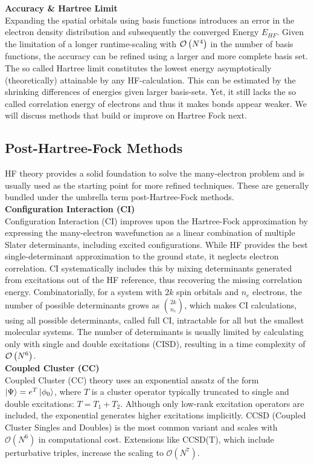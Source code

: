 \textbf{Accuracy \& Hartree Limit}\\
Expanding the spatial orbitals using basis functions introduces an error in the electron density distribution and subsequently the converged Energy $E_{HF}$. Given the limitation of a longer runtime-scaling with $\mathcal{O}\left(N^4\right)$ in the number of basis functions, the accuracy can be refined using a larger and more complete basis set. The so called Hartree limit constitutes the lowest energy asymptotically (theoretically) attainable by any HF-calculation. This can be estimated by the shrinking differences of energies given larger basis-sets. \parencite{ref:Jensen2005hf} Yet, it still lacks the so called correlation energy of electrons and thus it makes bonds appear weaker. We will discuss methods that build or improve on Hartree Fock next. 

\subsection{Post-Hartree-Fock Methods}
\label{subsec:background_post_hf}
HF theory provides a solid foundation to solve the many-electron problem and is usually used as the starting point for more refined techniques. These are generally bundled under the umbrella term post-Hartree-Fock methods.\\

\textbf{Configuration Interaction (CI)}\\
Configuration Interaction (CI) improves upon the Hartree-Fock approximation by expressing the many-electron wavefunction as a linear combination of multiple Slater determinants, including excited configurations. While HF provides the best single-determinant approximation to the ground state, it neglects electron correlation. CI systematically includes this by mixing determinants generated from excitations out of the HF reference, thus recovering the missing correlation energy. Combinatorially, for a system with $2k$ spin orbitals and $n_e$ electrons, the number of possible determinants grows as $\binom{2k}{n_e}$, which makes CI calculations, using all possible determinants, called full CI, intractable for all but the smallest molecular systems. The number of determinants is usually limited by calculating only with single and double excitations (CISD), resulting in a time complexity of $\mathcal{O}\left(N^6\right)$.\\

\textbf{Coupled Cluster (CC)}\\
Coupled Cluster (CC) theory uses an exponential ansatz of the form $\ket{\Psi} = e^T \ket{\phi_0}$, where $T$ is a cluster operator typically truncated to single and double excitations: $T = T_1 + T_2$. Although only low-rank excitation operators are included, the exponential generates higher excitations implicitly. CCSD (Coupled Cluster Singles and Doubles) is the most common variant and scales with $\mathcal{O}(N^6)$ in computational cost. Extensions like CCSD(T), which include perturbative triples, increase the scaling to $\mathcal{O}(N^7)$.

